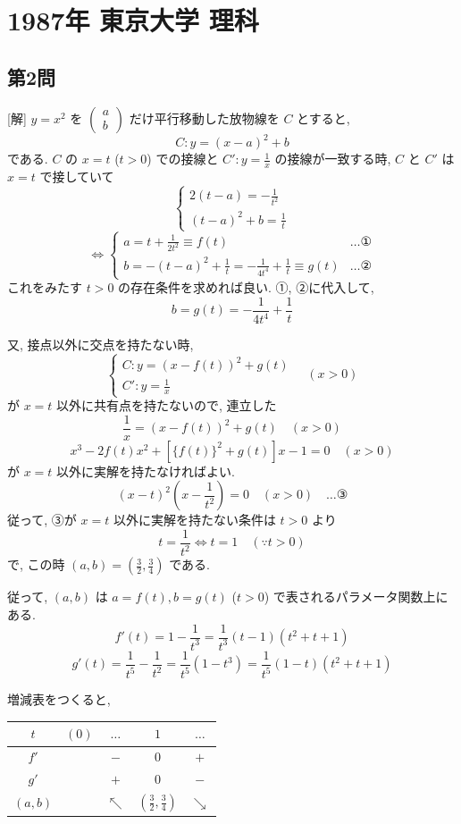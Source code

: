 \documentclass[../main.tex]{subfiles}
\begin{document}
\section*{1987年 東京大学 理科}

\subsection*{第2問}

[解] $y = x^2$ を $
\begin{pmatrix} a \\ b
\end{pmatrix}$ だけ平行移動した放物線を $C$ とすると,
\[
  C: y = (x-a)^2 + b
\]
である. $C$ の $x=t$ ($t>0$) での接線と $C': y = \frac{1}{x}$ の接線が一致する時, $C$ と $C'$ は $x=t$ で接していて
\[
  \begin{cases}
    2(t-a) = -\frac{1}{t^2} \\
    (t-a)^2 + b = \frac{1}{t}
  \end{cases}
\]
\[
  \iff
  \begin{cases}
    a = t + \frac{1}{2t^2} \equiv f(t) & \dots \text{①} \\
    b = -(t-a)^2 + \frac{1}{t} = -\frac{1}{4t^4} + \frac{1}{t} \equiv g(t) & \dots \text{②}
  \end{cases}
\]
これをみたす $t > 0$ の存在条件を求めれば良い. ①, ②に代入して,
\[
  b = g(t) = -\frac{1}{4t^4} + \frac{1}{t}
\]

又, 接点以外に交点を持たない時,
\[
  \begin{cases}
    C: y = (x - f(t))^2 + g(t) \\
    C': y = \frac{1}{x}
  \end{cases}
  \quad (x > 0)
\]
が $x=t$ 以外に共有点を持たないので, 連立した
\[
  \frac{1}{x} = (x - f(t))^2 + g(t) \quad (x > 0)
\]
\[
  x^3 - 2f(t)x^2 + \left[\{f(t)\}^2 + g(t)\right]x - 1 = 0 \quad (x > 0)
\]
が $x=t$ 以外に実解を持たなければよい.
\[
  (x-t)^2 \left( x - \frac{1}{t^2} \right) = 0 \quad (x > 0) \quad \dots \text{③}
\]
従って, ③が $x=t$ 以外に実解を持たない条件は $t > 0$ より
\[
  t = \frac{1}{t^2} \iff t = 1 \quad (\because t > 0)
\]
で, この時 $(a, b) = \left( \frac{3}{2}, \frac{3}{4} \right)$ である.

従って, $(a, b)$ は $a = f(t), b = g(t)$ ($t > 0$) で表されるパラメータ関数上にある.
\[
  f'(t) = 1 - \frac{1}{t^3} = \frac{1}{t^3}(t-1)(t^2 + t + 1)
\]
\[
  g'(t) = \frac{1}{t^5} - \frac{1}{t^2} = \frac{1}{t^5}(1 - t^3) = \frac{1}{t^5}(1-t)(t^2 + t + 1)
\]

増減表をつくると,
\begin{center}
  \begin{tabular}{c|c c c c}
    $t$ & $(0)$ & $\dots$ & $1$ & $\dots$ \\ \hline
    $f'$ & & $-$ & $0$ & $+$ \\ \hline
    $g'$ & & $+$ & $0$ & $-$ \\ \hline
    $(a,b)$ & & $\nwarrow$ & $\left(\frac{3}{2}, \frac{3}{4}\right)$ & $\searrow$
  \end{tabular}
\end{center}
\end{document}
